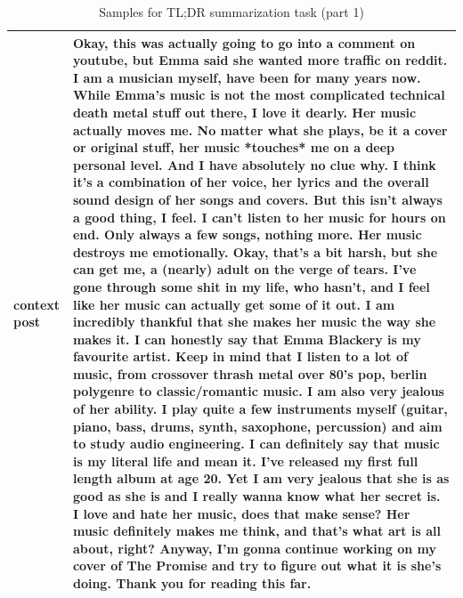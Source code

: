 
\begin{table}[t]
\begin{center}
\caption*{Samples for TL;DR summarization task (part 1)}
\begin{tabular}{|p{2cm}|p{12cm}|}

\hline
    
\hline
\textbf{context post}
&
\multicolumn{1}{|C{12cm}|}{ 
Okay, this was actually going to go into a comment on youtube, but Emma said she wanted more traffic on reddit.
\newline\newline
I am a musician myself, have been for many years now. While Emma's music is not the most complicated technical death metal stuff out there, I love it dearly. Her music actually moves me. No matter what she plays, be it a cover or original stuff, her music *touches* me on a deep personal level. And I have absolutely no clue why. I think it's a combination of her voice, her lyrics and the overall sound design of her songs and covers.
\newline\newline
But this isn't always a good thing, I feel. I can't listen to her music for hours on end. Only always a few songs, nothing more. Her music destroys me emotionally. Okay, that's a bit harsh, but she can get me, a (nearly) adult on the verge of tears. I've gone through some shit in my life, who hasn't, and I feel like her music can actually get some of it out. I am incredibly thankful that she makes her music the way she makes it. I can honestly say that Emma Blackery is my favourite artist. Keep in mind that I listen to a lot of music, from crossover thrash metal over 80's pop, berlin polygenre to classic/romantic music.
\newline\newline
I am also very jealous of her ability. I play quite a few instruments myself (guitar, piano, bass, drums, synth, saxophone, percussion) and aim to study audio engineering. I can definitely say that music is my literal life and mean it. I've released my first full length album at age 20. Yet I am very jealous that she is as good as she is and I really wanna know what her secret is. I love and hate her music, does that make sense?
\newline\newline
Her music definitely makes me think, and that's what art is all about, right? Anyway, I'm gonna continue working on my cover of The Promise and try to figure out what it is she's doing. Thank you for reading this far.
}
\\
\hline


\end{tabular}
\end{center}
\end{table}
